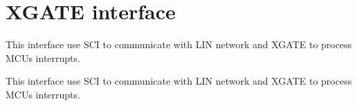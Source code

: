\hypertarget{group___x_g_a_t_e__group}{}\section{X\+G\+A\+T\+E interface}
\label{group___x_g_a_t_e__group}


This interface use S\+C\+I to communicate with L\+I\+N network and X\+G\+A\+T\+E to process M\+C\+U\textquotesingle{}s interrupts.  


This interface use S\+C\+I to communicate with L\+I\+N network and X\+G\+A\+T\+E to process M\+C\+U\textquotesingle{}s interrupts. 

